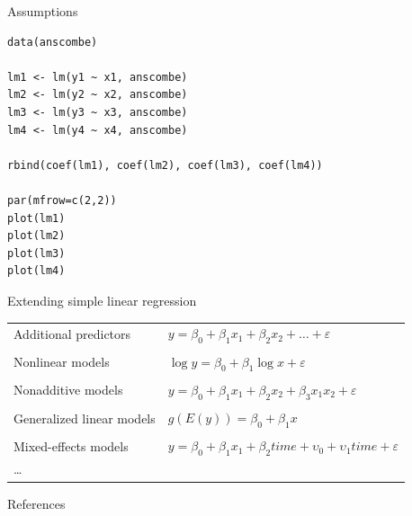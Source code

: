 \documentclass[aspectratio=169]{beamer}
\begin{document}
{

\begin{frame}[fragile]{Assumptions}
\begin{lstlisting}
data(anscombe)

lm1 <- lm(y1 ~ x1, anscombe)
lm2 <- lm(y2 ~ x2, anscombe)
lm3 <- lm(y3 ~ x3, anscombe)
lm4 <- lm(y4 ~ x4, anscombe)

rbind(coef(lm1), coef(lm2), coef(lm3), coef(lm4))

par(mfrow=c(2,2))
plot(lm1)
plot(lm2)
plot(lm3)
plot(lm4)
\end{lstlisting}
\end{frame}

}

\begin{frame}{Extending simple linear regression}
  \begin{tabular}{ll}
    Additional predictors &
      $y = \beta_0 + \beta_1 x_1 + \beta_2 x_2 + \dots +
      \varepsilon$\\
      & \\
    Nonlinear models &
      $\log y = \beta_0 + \beta_1 \log x + \varepsilon$\\
      & \\
    Nonadditive models &
      $y = \beta_0 + \beta_1 x_1 + \beta_2 x_2 + \beta_3
      x_1 x_2 + \varepsilon$\\
      & \\
    Generalized linear models &
      $g(E(y)) = \beta_0 + \beta_1 x$\\
      & \\
    Mixed-effects models &
      $y = \beta_0 + \beta_1 x_1 + \beta_2 time + 
      \upsilon_0 + \upsilon_1 time + \varepsilon$\\
      \dots & \\
  \end{tabular}
\end{frame}

\appendix

\begin{frame}{References}
  \printbibliography
  \vfill
\end{frame}
\end{document}
